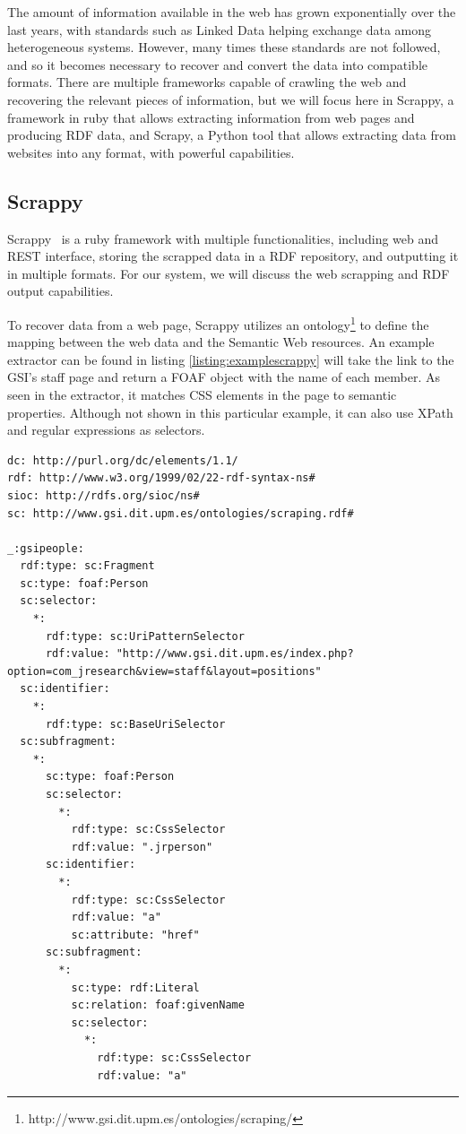 The amount of information available in the web has grown exponentially over the last years, with standards such as Linked Data helping exchange data among heterogeneous systems. However, many times these standards are not followed, and so it becomes necessary to recover and convert the data into compatible formats. There are multiple frameworks capable of crawling the web and recovering the relevant pieces of information, but we will focus here in Scrappy, a framework in ruby that allows extracting information from web pages and producing \ac{RDF} data, and Scrapy, a Python tool that allows extracting data from websites into any format, with powerful capabilities.


\subsection{Scrappy}
\label{subsec:scrappy}

Scrappy~\cite{villamor13} is a ruby framework with multiple functionalities, including web and REST interface, storing the scrapped data in a \ac{RDF} repository, and outputting it in multiple formats. For our system, we will discuss the web scrapping and \ac{RDF} output capabilities.

To recover data from a web page, Scrappy utilizes an ontology\footnote{http://www.gsi.dit.upm.es/ontologies/scraping/} to define the mapping between the web data and the Semantic Web resources. An example extractor can be found in listing \ref{listing:examplescrappy} will take the link to the GSI's staff page and return a FOAF object with the name of each member. As seen in the extractor, it matches CSS elements in the page to semantic properties. Although not shown in this particular example, it can also use XPath and regular expressions as selectors.

\begin{center} 
  \begin{lstlisting}[language={}, captionpos=b, caption=Example extractor for scrappy, label=listing:examplescrappy]   
dc: http://purl.org/dc/elements/1.1/
rdf: http://www.w3.org/1999/02/22-rdf-syntax-ns#
sioc: http://rdfs.org/sioc/ns#
sc: http://www.gsi.dit.upm.es/ontologies/scraping.rdf#

_:gsipeople:
  rdf:type: sc:Fragment
  sc:type: foaf:Person
  sc:selector:
    *:
      rdf:type: sc:UriPatternSelector
      rdf:value: "http://www.gsi.dit.upm.es/index.php?option=com_jresearch&view=staff&layout=positions"
  sc:identifier:
    *:
      rdf:type: sc:BaseUriSelector
  sc:subfragment:
    *:
      sc:type: foaf:Person
      sc:selector:
        *:
          rdf:type: sc:CssSelector
          rdf:value: ".jrperson"
      sc:identifier:
        *:
          rdf:type: sc:CssSelector
          rdf:value: "a"
          sc:attribute: "href"
      sc:subfragment:
        *:
          sc:type: rdf:Literal
          sc:relation: foaf:givenName
          sc:selector:
            *:
              rdf:type: sc:CssSelector
              rdf:value: "a"
  \end{lstlisting}
\end{center}

